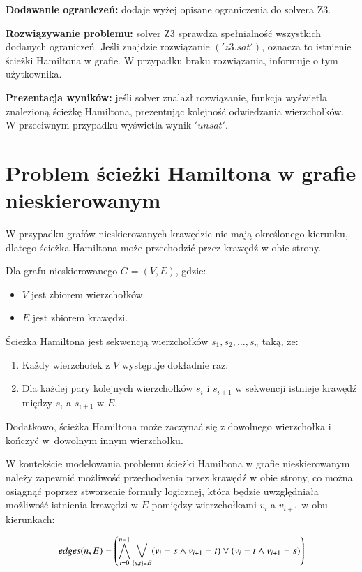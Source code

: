 \textbf{Dodawanie ograniczeń: } dodaje wyżej opisane ograniczenia do solvera Z3.

\textbf{Rozwiązywanie problemu: } solver Z3 sprawdza spełnialność wszystkich dodanych ograniczeń. Jeśli znajdzie rozwiązanie $('z3.sat')$, oznacza to istnienie ścieżki Hamiltona w grafie. W przypadku braku rozwiązania, informuje o tym użytkownika.

\textbf{Prezentacja wyników: } jeśli solver znalazł rozwiązanie, funkcja wyświetla znalezioną ścieżkę Hamiltona, prezentując kolejność odwiedzania wierzchołków. W przeciwnym przypadku wyświetla wynik $'unsat'$.




\section{Problem ścieżki Hamiltona w grafie nieskierowanym}

W przypadku grafów nieskierowanych krawędzie nie mają określonego kierunku, dlatego ścieżka Hamiltona może przechodzić przez krawędź w obie strony. 

Dla grafu nieskierowanego $G = (V, E)$, gdzie:
\begin{itemize}
	\item \(V\) jest zbiorem wierzchołków.
	\item \(E\) jest zbiorem krawędzi.
\end{itemize}
Ścieżka Hamiltona jest sekwencją wierzchołków $s_1, s_2, …, s_n$ taką, że:
\begin{enumerate}
	\item Każdy wierzchołek z \(V\) występuje dokładnie raz.
	\item Dla każdej pary kolejnych wierzchołków \(s_i\) i \(s_{i+1}\) w sekwencji istnieje krawędź między \(s_i\) a \(s_{i+1}\) w \(E\). 
\end{enumerate}

Dodatkowo, ścieżka Hamiltona może zaczynać się z dowolnego wierzchołka i kończyć w~dowolnym innym wierzchołku.

W kontekście modelowania problemu ścieżki Hamiltona w grafie nieskierowanym należy zapewnić możliwość przechodzenia przez krawędź w obie strony, co można osiągnąć poprzez stworzenie formuły logicznej, która będzie uwzględniała możliwość istnienia krawędzi w \(E\) pomiędzy wierzchołkami \(v_i\) a \(v_{i+1}\) w obu kierunkach:

\begin{align*}
	{\mathit{edges}}(n, E) = \left( \bigwedge_{i=0}^{n-1} \bigvee_{\{s,t\} \in E} (v_i = s \land v_{i+1} = t) \lor (v_i = t \land v_{i+1} = s) \right)
\end{align*}


